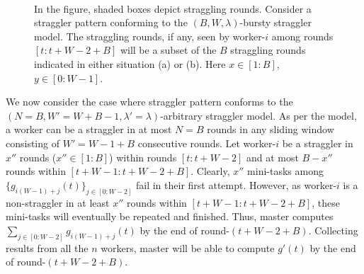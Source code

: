 \begin{figure}[b]
	\centering
	\ \ \ \ \ 
	\caption{In the figure, shaded boxes depict straggling rounds. Consider a straggler pattern conforming to the $(B,W,\lambda)$-bursty straggler model. The straggling rounds, if any, seen by worker-$i$ among rounds $[t:t+W-2+B]$ will be a subset of the $B$ straggling rounds indicated in either situation (a) or (b). Here $x\in[1:B]$, $y\in[0:W-1]$.}\label{fig:burst_model_distr_stragglers}
\end{figure}


We now consider the case where straggler pattern conforms to the  $(N=B,W'=W+B-1,\lambda'=\lambda)$-arbitrary straggler model. As per the model, a worker can be a straggler in at most $N=B$ rounds in any sliding window consisting of $W'=W-1+B$ consecutive rounds. Let worker-$i$ be a straggler in $x''$ rounds ($x''\in[1:B]$) within rounds $[t:t+W-2]$ and at most $B-x''$ rounds within $[t+W-1:t+W-2+B]$. Clearly, $x''$ mini-tasks among $\{g_{i(W-1)+j}(t)\}_{j\in[0:W-2]}$ fail in their first attempt. However, as worker-$i$ is a non-straggler in at least $x''$ rounds within $[t+W-1:t+W-2+B]$, these mini-tasks will eventually be repeated and  finished. Thus, master computes $\sum_{j\in [0:W-2]}g_{i(W-1)+j}(t)$ by the end of round-$(t+W-2+B)$. Collecting results from all the $n$ workers, master will be able to compute $g'(t)$ by the end of round-$(t+W-2+B)$.


